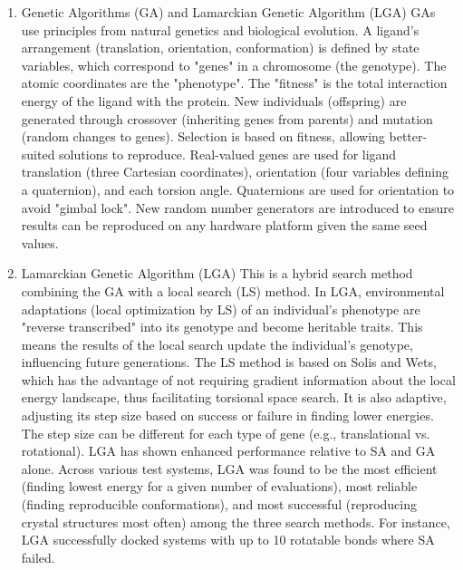 \documentclass[11pt]{article}
\begin{document}
\begin{enumerate}
\begin{enumerate}
\begin{enumerate}
    \end{enumerate}
\item Genetic Algorithms (GA) and Lamarckian Genetic Algorithm (LGA)
    GAs use principles from natural genetics and biological evolution. A ligand's arrangement (translation, orientation, conformation) is defined by state variables, which correspond to "genes" in a chromosome (the genotype). The atomic coordinates are the "phenotype". The "fitness" is the total interaction energy of the ligand with the protein. New individuals (offspring) are generated through crossover (inheriting genes from parents) and mutation (random changes to genes). Selection is based on fitness, allowing better-suited solutions to reproduce. Real-valued genes are used for ligand translation (three Cartesian coordinates), orientation (four variables defining a quaternion), and each torsion angle. Quaternions are used for orientation to avoid "gimbal lock". New random number generators are introduced to ensure results can be reproduced on any hardware platform given the same seed values.
    
\item Lamarckian Genetic Algorithm (LGA)
    This is a hybrid search method combining the GA with a local search (LS) method. In LGA, environmental adaptations (local optimization by LS) of an individual's phenotype are "reverse transcribed" into its genotype and become heritable traits. This means the results of the local search update the individual's genotype, influencing future generations. The LS method is based on Solis and Wets, which has the advantage of not requiring gradient information about the local energy landscape, thus facilitating torsional space search. It is also adaptive, adjusting its step size based on success or failure in finding lower energies. The step size can be different for each type of gene (e.g., translational vs. rotational).  LGA has shown enhanced performance relative to SA and GA alone. Across various test systems, LGA was found to be the most efficient (finding lowest energy for a given number of evaluations), most reliable (finding reproducible conformations), and most successful (reproducing crystal structures most often) among the three search methods. For instance, LGA successfully docked systems with up to 10 rotatable bonds where SA failed.
    
\end{enumerate}


\end{enumerate}
\end{document}
